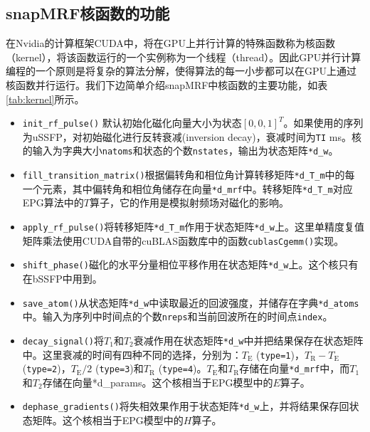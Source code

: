 \subsection{snapMRF核函数的功能}
在Nvidia的计算框架CUDA中，将在GPU上并行计算的特殊函数称为核函数（kernel），将该函数运行的一个实例称为一个线程（thread）。因此GPU并行计算编程的一个原则是将复杂的算法分解，使得算法的每一小步都可以在GPU上通过核函数并行运行。我们下边简单介绍snapMRF中核函数的主要功能，如表\ref{tab:kernel}所示。

\begin{itemize}
	\item \texttt{init\_rf\_pulse()} 默认初始化磁化向量大小为状态$[0,0,1]^T$。如果使用的序列为uSSFP，对初始磁化进行反转衰减(inversion decay)，衰减时间为\texttt{TI} ms。核的输入为字典大小\texttt{natoms}和状态的个数\texttt{nstates}，输出为状态矩阵\texttt{*d\_w}。 
	
	\item \texttt{fill\_transition\_matrix()}根据偏转角和相位角计算转移矩阵\texttt{*d\_T\_m}中的每一个元素，其中偏转角和相位角储存在向量\texttt{*d\_mrf}中。转移矩阵\texttt{*d\_T\_m}对应EPG算法中的$T$算子，它的作用是模拟射频场对磁化的影响。
	
	\item \texttt{apply\_rf\_pulse()}将转移矩阵\texttt{*d\_T\_m}作用于状态矩阵\texttt{*d\_w}上。这里单精度复值矩阵乘法使用CUDA自带的cuBLAS函数库中的函数\texttt{cublasCgemm()}实现。
	
	\item \texttt{shift\_phase()}磁化的水平分量相位平移作用在状态矩阵\texttt{*d\_w}上。这个核只有在bSSFP中用到。
	
	\item \texttt{save\_atom()}从状态矩阵\texttt{*d\_w}中读取最近的回波强度，并储存在字典\texttt{*d\_atoms}中。输入为序列中时间点的个数\texttt{nreps}和当前回波所在的时间点\texttt{index}。
	
	\item \texttt{decay\_signal()}将$T_1$和$T_2$衰减作用在状态矩阵\texttt{*d\_w}中并把结果保存在状态矩阵中。这里衰减的时间有四种不同的选择，分别为：$T_\mathrm{E}$ (\texttt{type=1})，$T_\mathrm{R}-T_\mathrm{E}$ (\texttt{type=2})，$T_\mathrm{E}/2$ (\texttt{type=3})和$T_\mathrm{R}$ (\texttt{type=4})。$T_\mathrm{E}$和$T_\mathrm{R}$存储在向量\texttt{*d\_mrf}中，而$T_1$和$T_2$存储在向量{*d\_params}。这个核相当于EPG模型中的$E$算子。
	
	\item \texttt{dephase\_gradients()}将失相效果作用于状态矩阵\texttt{*d\_w}上，并将结果保存回状态矩阵。这个核相当于EPG模型中的$H$算子。
\end{itemize}

